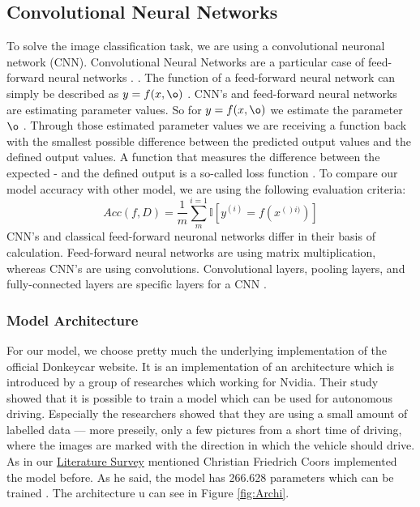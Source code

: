 \documentclass[journal]{IEEEtran}
\begin{document}
\subsection{Convolutional Neural Networks}
\label{subsec:cnn}
\noindent To solve the image classification task, we are using a convolutional neuronal network (CNN). Convolutional Neural Networks are a particular case of feed-forward neural networks \cite{Goodfellow-et-al-2016}. . The function of a feed-forward neural network can simply be described as \(y = f(x, \o )\) . CNN's and feed-forward neural networks are estimating parameter values. So for \(y = f(x, \o )\) we estimate the parameter \(\o \) \cite{Goodfellow-et-al-2016}. Through those estimated parameter values we are receiving a function back with the smallest possible difference between the predicted output values and the defined output values. A function that measures the difference between the expected - and the defined output is a so-called loss function \cite{Goodfellow-et-al-2016}. To compare our model accuracy with other model, we are using the following evaluation criteria:
\begin{equation}
Acc(f,D) = \frac{1}{m}\sum_{m}^{i=1} \mathbb{I} \left [ y^{(i)} =f(x^{()i)})\right ]
\label{acc}
\end{equation}
CNN's and classical feed-forward neuronal networks differ in their basis of calculation. Feed-forward neural networks are using matrix multiplication, whereas CNN's are using convolutions. Convolutional layers, pooling layers, and fully-connected layers are specific layers for a CNN \cite{LeCun1998}. \\
\subsubsection{Model Architecture}
\label{subsec:ModelArchitecture}
For our model, we choose pretty much the underlying implementation of the official Donkeycar website. It is an implementation of an architecture which is introduced by a group of researches which working for Nvidia. Their study showed that it is possible to train a model which can be used for autonomous driving. Especially the researchers showed that they are using a small amount of labelled data — more preseily,   only a few pictures from a short time of driving, where the images are marked with the direction in which the vehicle should drive\cite{LearningForSelf-DrivingCars}. As in our \hyperref[sec:LiteratureSurvey]{Literature Survey} mentioned Christian Friedrich Coors implemented the model before.  As he said, the model has 266.628 parameters which can be trained \cite{Coors}. The architecture u can see in Figure \ref{fig:Archi}.
\end{document}
